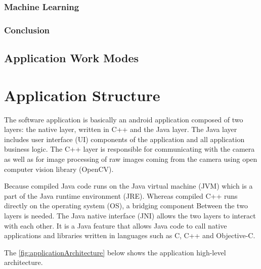 \subsubsection{Machine Learning}



\subsubsection{Conclusion}

\subsection{Application Work Modes}






\section{Application Structure}
The software application is basically an android application composed of two layers: the native layer, written in C++ and the Java layer. 
The Java layer includes user interface (UI) components of the application and all application business logic. 
The C++ layer is responsible for communicating with the camera as well as for image processing of raw images coming from the camera using open computer vision library (OpenCV).

Because compiled Java code runs on the Java virtual machine (JVM) which is a part of the Java runtime environment (JRE). Whereas compiled C++ runs directly on the operating system (OS), a bridging component Between the two layers is needed.
The Java native interface (JNI) allows the two layers to interact with each other. It is a Java feature that allows Java code to call native applications and libraries written in languages such as C, C++ and Objective-C.

The \autoref{fig:applicationArchitecture} below shows the application high-level architecture.


